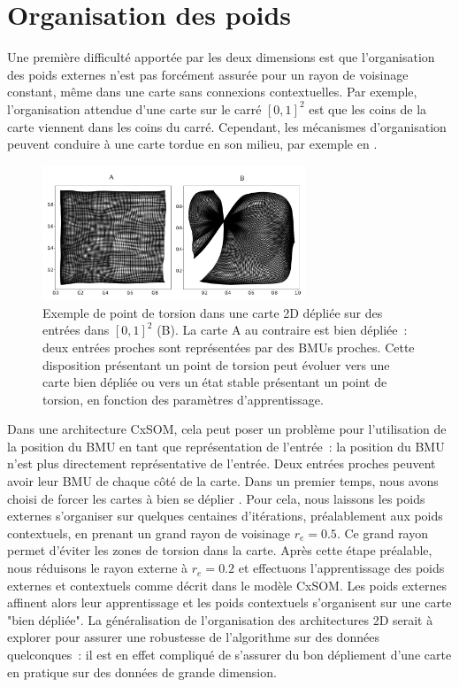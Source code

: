 \documentclass[../main]{subfiles}
\begin{document}
\section{Organisation des poids}

Une première difficulté apportée par les deux dimensions est que l'organisation des poids externes n'est pas forcément assurée pour un rayon de voisinage constant, même dans une carte sans connexions contextuelles. Par exemple, l'organisation attendue d'une carte sur le carré $[0,1]^2$ est que les coins de la carte viennent dans les coins du carré. Cependant, les mécanismes d'organisation peuvent conduire à une carte tordue en son milieu, par exemple en \label{fig:torsion}.

\begin{figure}
	\centering\includegraphics[width=0.7\textwidth]{we_cub_example.pdf}
	\caption{Exemple de point de torsion dans une carte 2D dépliée sur des entrées dans $[0,1]^2$ (B). La carte A au contraire est bien dépliée~: deux entrées proches sont représentées par des BMUs proches. Cette disposition présentant un point de torsion peut évoluer vers une carte bien dépliée ou vers un état stable présentant un point de torsion, en fonction des paramètres d'apprentissage. \label{fig:torsion}
	}
\end{figure}

Dans une architecture CxSOM, cela peut poser un problème pour l'utilisation de la position du BMU en tant que représentation de l'entrée~: la position du BMU n'est plus directement représentative de l'entrée. Deux entrées proches peuvent avoir leur BMU de chaque côté de la carte.
Dans un premier temps, nous avons choisi de forcer les cartes à bien se déplier . Pour cela, nous laissons les poids externes s'organiser sur quelques centaines d'itérations, préalablement aux poids contextuels, en prenant un grand rayon de voisinage $r_e = 0.5$. 
Ce grand rayon permet d'éviter les zones de torsion dans la carte. Après cette étape préalable, nous réduisons le rayon externe  à $r_e = 0.2$ et effectuons l'apprentissage des poids externes et contextuels comme décrit dans le modèle CxSOM. Les poids externes affinent alors leur apprentissage et les poids contextuels s'organisent sur une carte "bien dépliée". 
La généralisation de l'organisation des architectures 2D serait à explorer pour assurer une robustesse de l'algorithme sur des données quelconques~: il est en effet compliqué de s'assurer du bon dépliement d'une carte en pratique sur des données de grande dimension.
\end{document}
